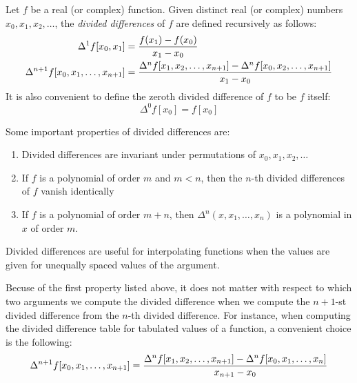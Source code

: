 \documentclass[12pt]{article}
\begin{document}
Let $f$ be a real (or complex) function.  Given distinct real (or complex) numbers $x_0, x_1, x_2, \ldots$, the \emph{divided differences} of $f$ are defined recursively as follows:
\begin{align*}
\Delta^1 f [x_0, x_1] &= {f(x_1) - f(x_0) \over x_1 - x_0} \\
\Delta^{n+1} f [x_0, x_1,\ldots, x_{n+1}] &= {\Delta^n f [x_1, x_2, \ldots ,x_{n+1}] - \Delta^n f [x_0, x_2 ,\ldots, x_{n+1}] \over x_1 - x_0}
\end{align*}
It is also convenient to define the zeroth divided difference of
$f$ to be $f$ itself:
\[
\Delta^0 f [x_0] = f[x_0]
\]

Some important properties of divided differences are:

\begin{enumerate}
\item  Divided differences are invariant under permutations of $x_0, x_1, x_2, \ldots$
\item  If $f$ is a polynomial of order $m$ and $m < n$, then the $n$-th divided differences of $f$ vanish identically
\item  If $f$ is a polynomial of order $m+n$, then $\Delta^n (x,x_1, \ldots ,x_n)$ is a polynomial in $x$ of order $m$.
\end{enumerate}

Divided differences are useful for interpolating functions when the values are given for unequally spaced values of the argument.

Becuse of the first property listed above, it does not matter with 
respect to which two arguments we compute the divided difference
when we compute the $n+1$-st divided difference from the $n$-th 
divided difference.  For instance, when computing the divided 
difference table for tabulated values of a function, a convenient
choice is the following:
\[
\Delta^{n+1} f [x_0, x_1,\ldots, x_{n+1}] = {\Delta^n f [x_1, x_2, \ldots ,x_{n+1}] - \Delta^n f [x_0, x_1 ,\ldots, x_{n}] \over x_{n+1} - x_0}
\]
\end{document}
